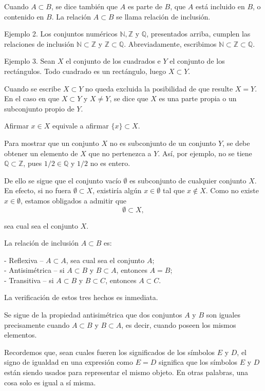 \documentclass[12pt,oneside]{book}
\begin{document}
Cuando \(A \subset B\), se dice también que \(A\) es parte de \(B\), que \(A\) está incluido en \(B\), o contenido en \(B\). La relación \(A \subset B\) se llama relación de inclusión.

Ejemplo 2. Los conjuntos numéricos \(\mathbb{N}, \mathbb{Z}\) y \(\mathbb{Q}\), presentados arriba, cumplen las relaciones de inclusión \(\mathbb{N} \subset \mathbb{Z}\) y \(\mathbb{Z} \subset \mathbb{Q}\). Abreviadamente, escribimos \(\mathbb{N} \subset \mathbb{Z} \subset \mathbb{Q}\).

Ejemplo 3. Sean \(X\) el conjunto de los cuadrados e \(Y\) el conjunto de los rectángulos. Todo cuadrado es un rectángulo, luego \(X \subset Y\).

Cuando se escribe \(X \subset Y\) no queda excluida la posibilidad de que resulte \(X = Y\). En el caso en que \(X \subset Y\) y \(X \neq Y\), se dice que \(X\) es una parte propia o un subconjunto propio de \(Y\).

Afirmar \(x \in X\) equivale a afirmar \(\{x\} \subset X\).

Para mostrar que un conjunto \(X\) no es subconjunto de un conjunto \(Y\), se debe obtener un elemento de \(X\) que no pertenezca a \(Y\). Así, por ejemplo, no se tiene \(\mathbb{Q} \subset \mathbb{Z}\), pues \(1/2 \in \mathbb{Q}\) y \(1/2\) no es entero.

De ello se sigue que el conjunto vacío \(\emptyset\) es subconjunto de cualquier conjunto \(X\). En efecto, si no fuera \(\emptyset \subset X\), existiría algún \(x \in \emptyset\) tal que \(x \notin X\). Como no existe \(x \in \emptyset\), estamos obligados a admitir que
\[\emptyset \subset X,\]

sea cual sea el conjunto \(X\).

La relación de inclusión \(A \subset B\) es:

- Reflexiva – \(A \subset A\), sea cual sea el conjunto \(A\);\\
- Antisimétrica – si \(A \subset B\) y \(B \subset A\), entonces \(A = B\);\\
- Transitiva – si \(A \subset B\) y \(B \subset C\), entonces \(A \subset C\).

La verificación de estos tres hechos es inmediata.

Se sigue de la propiedad antisimétrica que dos conjuntos \(A\) y \(B\) son iguales precisamente cuando \(A \subset B\) y \(B \subset A\), es decir, cuando poseen los mismos elementos.

Recordemos que, sean cuales fueren los significados de los símbolos \(E\) y \(D\), el signo de igualdad en una expresión como \(E = D\) significa que los símbolos \(E\) y \(D\) están siendo usados para representar el mismo objeto. En otras palabras, una cosa solo es igual a sí misma.
\end{document}
